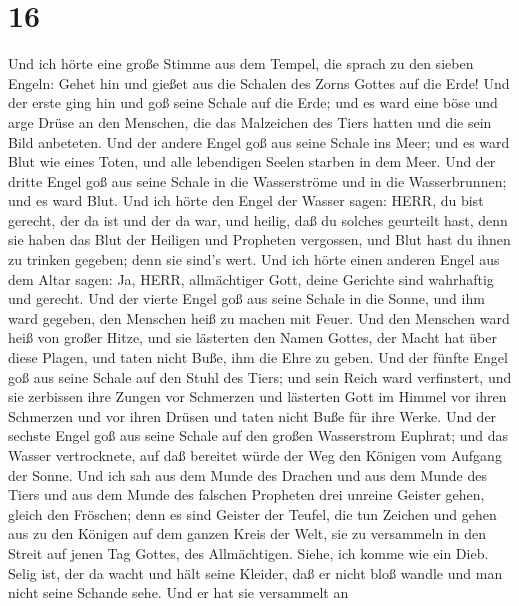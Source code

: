\hypertarget{section-15}{%
\section{16}\label{section-15}}

 Und ich hörte eine große Stimme aus dem Tempel, die sprach
zu den sieben Engeln: Gehet hin und gießet aus die Schalen des Zorns
Gottes auf die Erde!  Und der erste ging hin und goß seine
Schale auf die Erde; und es ward eine böse und arge Drüse an den
Menschen, die das Malzeichen des Tiers hatten und die sein Bild
anbeteten.  Und der andere Engel goß aus seine Schale ins
Meer; und es ward Blut wie eines Toten, und alle lebendigen Seelen
starben in dem Meer.  Und der dritte Engel goß aus seine
Schale in die Wasserströme und in die Wasserbrunnen; und es ward Blut.
 Und ich hörte den Engel der Wasser sagen: HERR, du bist
gerecht, der da ist und der da war, und heilig, daß du solches geurteilt
hast,  denn sie haben das Blut der Heiligen und Propheten
vergossen, und Blut hast du ihnen zu trinken gegeben; denn sie sind's
wert.  Und ich hörte einen anderen Engel aus dem Altar
sagen: Ja, HERR, allmächtiger Gott, deine Gerichte sind wahrhaftig und
gerecht.  Und der vierte Engel goß aus seine Schale in die
Sonne, und ihm ward gegeben, den Menschen heiß zu machen mit Feuer.
 Und den Menschen ward heiß von großer Hitze, und sie
lästerten den Namen Gottes, der Macht hat über diese Plagen, und taten
nicht Buße, ihm die Ehre zu geben.  Und der fünfte Engel
goß aus seine Schale auf den Stuhl des Tiers; und sein Reich ward
verfinstert, und sie zerbissen ihre Zungen vor Schmerzen 
und lästerten Gott im Himmel vor ihren Schmerzen und vor ihren Drüsen
und taten nicht Buße für ihre Werke.  Und der sechste Engel
goß aus seine Schale auf den großen Wasserstrom Euphrat; und das Wasser
vertrocknete, auf daß bereitet würde der Weg den Königen vom Aufgang der
Sonne.  Und ich sah aus dem Munde des Drachen und aus dem
Munde des Tiers und aus dem Munde des falschen Propheten drei unreine
Geister gehen, gleich den Fröschen;  denn es sind Geister
der Teufel, die tun Zeichen und gehen aus zu den Königen auf dem ganzen
Kreis der Welt, sie zu versammeln in den Streit auf jenen Tag Gottes,
des Allmächtigen.  Siehe, ich komme wie ein Dieb. Selig
ist, der da wacht und hält seine Kleider, daß er nicht bloß wandle und
man nicht seine Schande sehe.  Und er hat sie versammelt an
